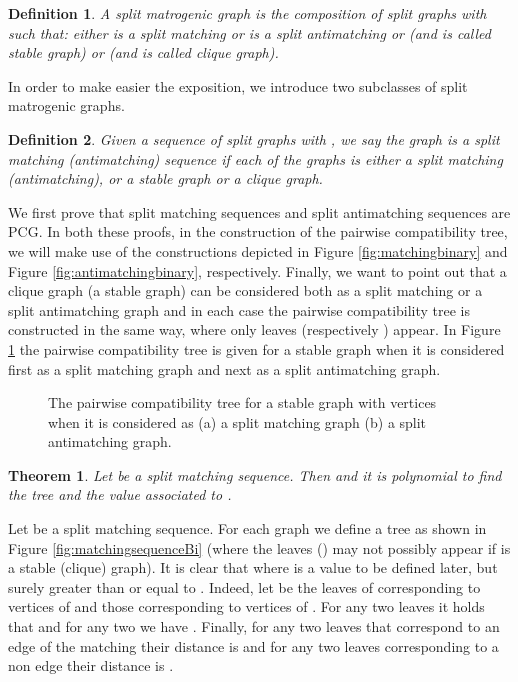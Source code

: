 \documentclass[dvipdfm]{llncs}
\newtheorem{Theorem}{Theorem}
\newtheorem{Definition}{Definition}
\begin{document}
\begin{Definition}
A {\em split matrogenic} graph is the composition of  split graphs  with  such that: either  is a split matching or  is a split antimatching or  (and  is called {\em stable graph}) or  (and  is called {\em clique graph}).
\end{Definition}

In order to make easier the exposition, we introduce two subclasses of split matrogenic graphs.

\begin{Definition}
Given a sequence of  split graphs  with , we say the graph  is a {\em split matching (antimatching) sequence} if each of the graphs  is either a split matching (antimatching), or a  stable graph or a clique graph. 
\end{Definition}


We first prove that split matching sequences and split antimatching sequences are PCG. In both these proofs, in the construction of the pairwise compatibility tree, we will make use of the constructions depicted in Figure \ref{fig:matchingbinary} and Figure  \ref{fig:antimatchingbinary}, respectively. Finally, we want to point out that a clique graph (a stable graph) can be considered both as a split matching or a split antimatching graph and in each case the pairwise compatibility tree is constructed in the same way, where only leaves  (respectively ) appear. In Figure \ref{fig:matchingAntimatchingEmpty} the pairwise compatibility tree is given for a stable graph  when it is considered first as a split matching graph and next as a split antimatching graph.


\begin{figure}[!ht]
  \begin{center}
  \end{center}
\caption{\footnotesize{ The pairwise compatibility tree for a stable graph  with  vertices when it is considered as (a) a split matching graph  (b) a split antimatching graph. }}
\label{fig:matchingAntimatchingEmpty}
\end{figure}



\begin{Theorem}\label{theo:matchingSequence}
Let  be a split matching sequence. Then  and it is polynomial to find the tree and the value  associated to .
\end{Theorem}
\proof
Let  be a  split matching sequence. For each graph  we define a tree  as shown in Figure \ref{fig:matchingsequenceBi} (where the leaves  () may not possibly appear if  is a stable (clique) graph). It is clear that  where  is a value to be defined later, but surely greater than or equal to . Indeed, let  be the leaves of  corresponding to vertices of  and  those corresponding to vertices of . For any two leaves  it holds that  and for any two  we have . Finally, for any two leaves  that correspond to an edge of the matching their distance is  and for any two leaves corresponding to a non edge  their distance is . 
\end{document}

